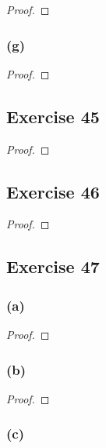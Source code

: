 \documentclass[14pt]{extarticle}
\begin{document}
\begin{proof}

\end{proof}

\subsubsection{(g)}

\begin{proof}

\end{proof}

\subsection{Exercise 45}

\begin{proof}

\end{proof}

\subsection{Exercise 46}

\begin{proof}

\end{proof}

\subsection{Exercise 47}

\subsubsection{(a)}

\begin{proof}

\end{proof}

\subsubsection{(b)}

\begin{proof}

\end{proof}

\subsubsection{(c)}
\end{document}
